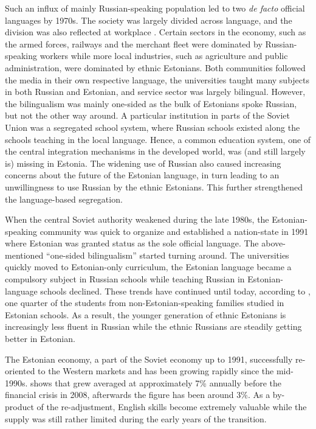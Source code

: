 \documentclass[12pt, a4paper]{article}
\begin{document}
Such an influx of mainly
Russian-speaking population
led to two \emph{de facto} official languages
by 1970s.
The society was largely divided across language, and the division was
also reflected at workplace \citep{leppik+vihalemm2015JofBaltStud}.
Certain sectors in the economy, such as the armed forces, railways and the
merchant fleet
were dominated by
Russian-speaking workers while more local industries,
such as agriculture and
public administration,
were dominated by ethnic Estonians.
Both communities followed the media in their own respective language, the
universities taught many subjects in both Russian and Estonian,
and service sector was largely bilingual. However, the bilingualism
was mainly one-sided as the bulk of Estonians spoke Russian, but not
the other way around. A particular institution in parts of the Soviet
Union was a segregated school system, where Russian schools existed along the
schools teaching in the local language. Hence, a common education
system, one of the central integration mechanisms in the developed world,
was (and still largely is) missing in Estonia.
The widening use of Russian also
caused increasing concerns about the future of the Estonian
language, in turn leading to an unwillingness to use Russian by
the ethnic Estonians. This further strengthened the language-based segregation.

When the central Soviet authority weakened during the late 1980s, the
Estonian-speaking community was quick to organize and established a
nation-state in 1991 where
Estonian was granted status as the sole official language. The
above-mentioned ``one-sided bilingualism'' started turning
around. The universities quickly moved to Estonian-only curriculum,
the Estonian language became a compulsory subject in Russian schools
while teaching Russian in Estonian-language schools declined.
These trends have continued until today, according to
\citet{HTM2015}, one quarter of the students from non-Estonian-speaking families studied in Estonian schools.
As a result, the younger generation of ethnic Estonians is
increasingly less fluent in Russian while the ethnic Russians are
steadily getting better in Estonian.

The Estonian economy, a part of the Soviet economy up to 1991, successfully
re-oriented to the Western markets and has been growing rapidly since
the mid-1990s. 
 shows that grew averaged at approximately 7\%
annually
before the financial crisis in 2008, afterwards the figure has been around 3\%.
As a by-product of the re-adjustment, English skills become extremely
valuable while the supply was still rather limited during the early
years of the transition.
\end{document}
